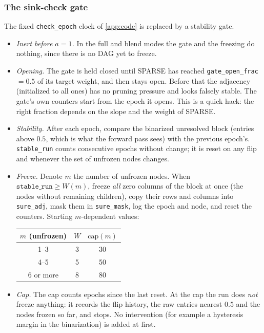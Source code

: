 \subsubsection{The sink-check gate}
The fixed \texttt{check\_epoch} clock of \cref{app:code} is replaced by a stability
gate.
\begin{itemize}[leftmargin=1.5em]
\item \emph{Inert before $a=1$.} In the full and blend modes the gate and the freezing
      do nothing, since there is no DAG yet to freeze.
\item \emph{Opening.} The gate is held closed until SPARSE has reached
      \texttt{gate\_open\_frac}$=0.5$ of its target weight, and then stays open.
      Before that the adjacency (initialized to all ones) has no pruning pressure and
      looks falsely stable. The gate's own counters start from the epoch it opens.
      This is a quick hack: the right fraction depends on the slope and the weight of
      SPARSE.
\item \emph{Stability.} After each epoch, compare the binarized unresolved block
      (entries above $0.5$, which is what the forward pass sees) with the previous
      epoch's. \texttt{stable\_run} counts consecutive epochs without change; it is
      reset on any flip and whenever the set of unfrozen nodes changes.
\item \emph{Freeze.} Denote $m$ the number of unfrozen nodes. When
      $\texttt{stable\_run}\ge W(m)$, freeze \emph{all} zero columns of the block at
      once (the nodes without remaining children), copy their rows and columns into
      \texttt{sure\_adj}, mask them in \texttt{sure\_mask}, log the epoch and node,
      and reset the counters. Starting $m$-dependent values:
\begin{center}
\begin{tabular}{@{}ccc@{}}
\toprule
$m$ (unfrozen) & $W$ & $\mathrm{cap}(m)$\\
\midrule
1--3 & 3 & 30\\
4--5 & 5 & 50\\
6 or more & 8 & 80\\
\bottomrule
\end{tabular}
\end{center}
\item \emph{Cap.} The cap counts epochs since the last reset. At the cap the run does
      \emph{not} freeze anything: it records the flip history, the raw entries nearest
      $0.5$ and the nodes frozen so far, and stops. No intervention (for example a
      hysteresis margin in the binarization) is added at first.

\end{itemize}
